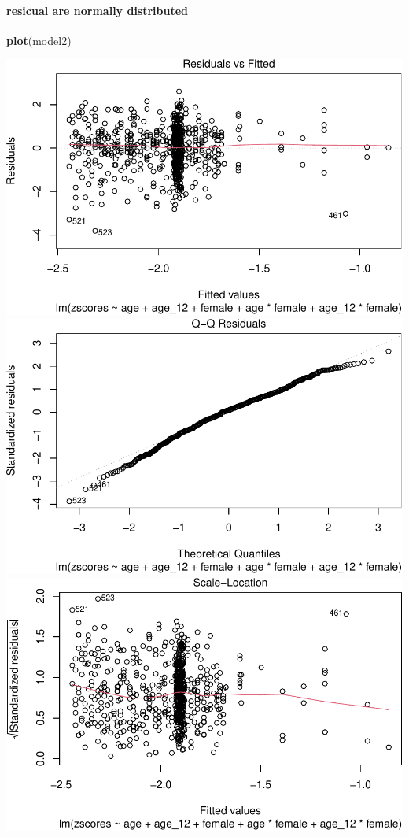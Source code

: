 \documentclass[
]{article}
\newenvironment{Shaded}{\begin{snugshade}}{\end{snugshade}}
\newcommand{\FunctionTok}[1]{\textcolor[rgb]{0.13,0.29,0.53}{\textbf{#1}}}
\newcommand{\NormalTok}[1]{#1}
\begin{document}
\hypertarget{resicual-are-normally-distributed}{%
\paragraph{resicual are normally
distributed}\label{resicual-are-normally-distributed}}

\begin{Shaded}
\begin{Highlighting}[]
\FunctionTok{plot}\NormalTok{(model2)}
\end{Highlighting}
\end{Shaded}

\includegraphics{ProblemSet3_ts_1677791812_files/figure-latex/unnamed-chunk-17-1.pdf}
\includegraphics{ProblemSet3_ts_1677791812_files/figure-latex/unnamed-chunk-17-2.pdf}
\includegraphics{ProblemSet3_ts_1677791812_files/figure-latex/unnamed-chunk-17-3.pdf}
\end{document}

